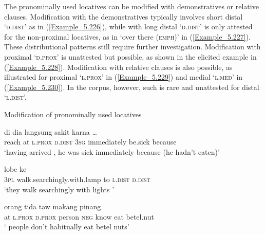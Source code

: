 The pronominally used locatives can be modified with demonstratives or relative clauses. Modification with the demonstratives typically involves short distal  ‘\textsc{d.dist}’ as in (\ref{Example_5.226}), while  with long distal  ‘\textsc{d.dist}’ is only attested for the non-proximal locatives, as in  ‘over there (\textsc{emph})’ in (\ref{Example_5.227}). These distributional patterns still require further investigation. Modification with proximal  ‘\textsc{d.prox}’ is unattested but possible, as shown in the elicited example in (\ref{Example_5.228}). Modification with relative clauses is also possible, as illustrated for proximal  ‘\textsc{l.prox}’ in (\ref{Example_5.229}) and medial  ‘\textsc{l.med}’ in (\ref{Example_5.230}). In the corpus, however, such  is rare and unattested for distal  ‘\textsc{l.dist}’.


\begin{styleExampleTitle}
Modification of pronominally used locatives
\end{styleExampleTitle}

\ea
\label{Example_5.226}
 {di} {} {} {dia} {langsung} {sakit} {karna} {{\ldots}}\\ %
 reach  at  \textsc{l.prox}  \textsc{d.dist}  \textsc{3sg}  immediately  be.sick  because  \\
\glt 
‘having arrived \bluebold{)}, he was sick immediately because (he hadn’t eaten)’ \textstyleExampleSource{[081025-008-Cv.0050]}
\z

\ea
\label{Example_5.227}
 {lobe} {ke} {} {}\\ %
 \textsc{3pl}  walk.searchingly.with.lamp  to  \textsc{l.dist}  \textsc{d.dist}\\
\glt 
‘they walk searchingly with lights \bluebold{)}’ \textstyleExampleSource{[081108-001-JR.0002]}
\z

\ea
\label{Example_5.228}
 {} {} {orang} {tida} {taw} {makang} {pinang}\\ %
 at  \textsc{l.prox}  \textsc{d.prox}  person  \textsc{neg}  know  eat  betel.nut\\
\glt 
‘\bluebold{)} people don’t habitually eat betel nuts’ \textstyleExampleSource{[Elicited BR111017.001]}
\z

